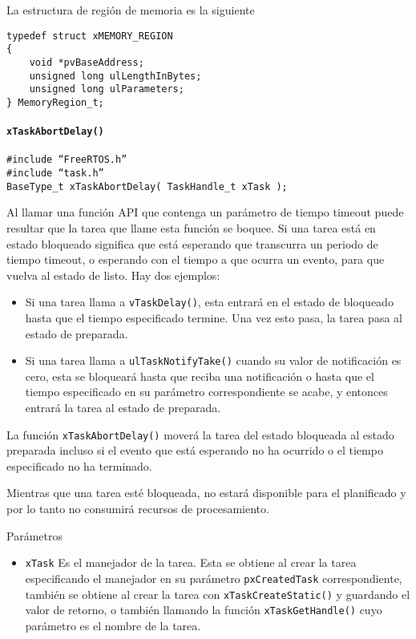 La estructura de región de memoria es la siguiente

\begin{verbatim}
typedef struct xMEMORY_REGION
{   
    void *pvBaseAddress;
    unsigned long ulLengthInBytes;
    unsigned long ulParameters;
} MemoryRegion_t;
\end{verbatim}


\paragraph{\texttt{xTaskAbortDelay()}}

\begin{verbatim}
#include “FreeRTOS.h”
#include “task.h”
BaseType_t xTaskAbortDelay( TaskHandle_t xTask );
\end{verbatim}

Al llamar una función API que contenga un parámetro de tiempo timeout puede resultar que la tarea que llame esta función se boquee. Si una tarea está en estado bloqueado significa que está esperando que transcurra un periodo de tiempo timeout, o esperando con el tiempo a que ocurra un evento, para que vuelva al estado de listo. Hay dos ejemplos:

\begin{itemize}
    \item Si una tarea llama a \texttt{vTaskDelay()}, esta entrará en el estado de bloqueado hasta que el tiempo especificado termine. Una vez esto pasa, la tarea pasa al estado de preparada. 
    \item Si una tarea llama a \texttt{ulTaskNotifyTake()} cuando su valor de notificación es cero, esta se bloqueará hasta que reciba una notificación o hasta que el tiempo especificado en su parámetro correspondiente se acabe, y entonces entrará la tarea al estado de preparada.
\end{itemize}

La función \texttt{xTaskAbortDelay()} moverá la tarea del estado bloqueada al estado preparada incluso si el evento que está esperando no ha ocurrido o el tiempo especificado no ha terminado.

Mientras que una tarea esté bloqueada, no estará disponible para el planificado y por lo tanto no consumirá recursos de procesamiento.

Parámetros

\begin{itemize}
    \item \texttt{xTask} Es el manejador de la tarea. Esta se obtiene al crear la tarea especificando el manejador en su parámetro \texttt{pxCreatedTask} correspondiente, también se obtiene al crear la tarea con \texttt{xTaskCreateStatic()} y guardando el valor de retorno, o también llamando la función \texttt{xTaskGetHandle()} cuyo parámetro es el nombre de la tarea. 
\end{itemize}

